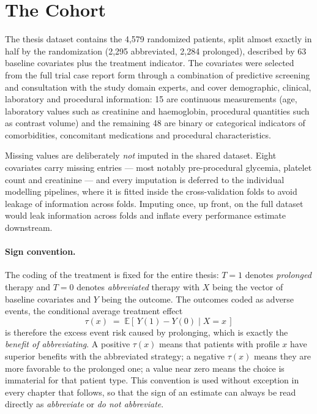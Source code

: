 \section{The Cohort}

The thesis dataset contains the 4,579 randomized patients, split almost
exactly in half by the randomization (2,295 abbreviated, 2,284 prolonged),
described by 63 baseline covariates plus the treatment indicator. The
covariates were selected from the full trial case report form through a
combination of predictive screening and consultation with the study domain
experts, and cover demographic, clinical, laboratory and procedural
information: 15 are continuous measurements (age, laboratory values such as
creatinine and haemoglobin, procedural quantities such as contrast
volume) and the remaining 48 are binary or categorical indicators of
comorbidities, concomitant medications and procedural characteristics.

Missing values are deliberately \emph{not} imputed in the shared dataset.
Eight covariates carry missing entries — most notably pre-procedural glycemia,
platelet count and creatinine — and every imputation is deferred to the
individual modelling pipelines, where it is fitted inside the
cross-validation folds to avoid leakage of information across folds.
 Imputing once, up front, on the full dataset would
leak information across folds and inflate every performance estimate
downstream.

\paragraph{Sign convention.}
The coding of the treatment is fixed for the entire thesis: $T = 1$ denotes
\emph{prolonged} therapy and $T = 0$ denotes \emph{abbreviated} therapy with $X$ 
being the vector of baseline covariates and $Y$ being the outcome. The
outcomes coded as adverse events, the conditional average treatment effect
\[
  \tau(x) \;=\; \mathbb{E}\!\left[\,Y(1) - Y(0) \mid X = x\,\right]
\]
is therefore the excess event risk caused by prolonging, which is exactly the
\emph{benefit of abbreviating}. A positive $\tau(x)$ means that patients with
profile $x$ have superior benefits with the abbreviated strategy; a negative $\tau(x)$
means they are more favorable to the prolonged one; 
a value near zero means the
choice is immaterial for that patient type. This convention is used without
exception in every chapter that follows, so that the sign of an estimate can
always be read directly as \emph{abbreviate} or \emph{do not abbreviate}.

